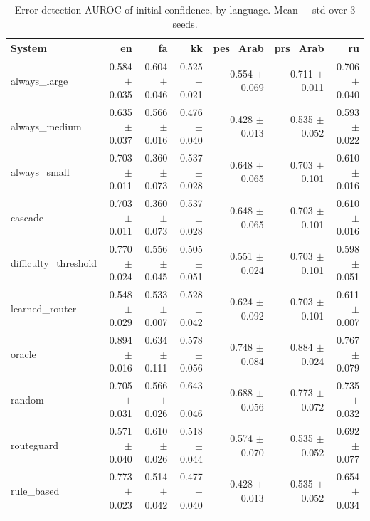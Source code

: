 \begin{table}[t]
\centering
\small
\caption{Error-detection AUROC of initial confidence, by language. Mean $\pm$ std over 3 seeds.}
\label{tab:language_reliability}
\begin{tabular}{lrrrrrr}
\toprule
System & en & fa & kk & pes\_Arab & prs\_Arab & ru \\
\midrule
always\_large & 0.584 $\pm$ 0.035 & 0.604 $\pm$ 0.046 & 0.525 $\pm$ 0.021 & 0.554 $\pm$ 0.069 & 0.711 $\pm$ 0.011 & 0.706 $\pm$ 0.040 \\
always\_medium & 0.635 $\pm$ 0.037 & 0.566 $\pm$ 0.016 & 0.476 $\pm$ 0.040 & 0.428 $\pm$ 0.013 & 0.535 $\pm$ 0.052 & 0.593 $\pm$ 0.022 \\
always\_small & 0.703 $\pm$ 0.011 & 0.360 $\pm$ 0.073 & 0.537 $\pm$ 0.028 & 0.648 $\pm$ 0.065 & 0.703 $\pm$ 0.101 & 0.610 $\pm$ 0.016 \\
cascade & 0.703 $\pm$ 0.011 & 0.360 $\pm$ 0.073 & 0.537 $\pm$ 0.028 & 0.648 $\pm$ 0.065 & 0.703 $\pm$ 0.101 & 0.610 $\pm$ 0.016 \\
difficulty\_threshold & 0.770 $\pm$ 0.024 & 0.556 $\pm$ 0.045 & 0.505 $\pm$ 0.051 & 0.551 $\pm$ 0.024 & 0.703 $\pm$ 0.101 & 0.598 $\pm$ 0.051 \\
learned\_router & 0.548 $\pm$ 0.029 & 0.533 $\pm$ 0.007 & 0.528 $\pm$ 0.042 & 0.624 $\pm$ 0.092 & 0.703 $\pm$ 0.101 & 0.611 $\pm$ 0.007 \\
oracle & 0.894 $\pm$ 0.016 & 0.634 $\pm$ 0.111 & 0.578 $\pm$ 0.056 & 0.748 $\pm$ 0.084 & 0.884 $\pm$ 0.024 & 0.767 $\pm$ 0.079 \\
random & 0.705 $\pm$ 0.031 & 0.566 $\pm$ 0.026 & 0.643 $\pm$ 0.046 & 0.688 $\pm$ 0.056 & 0.773 $\pm$ 0.072 & 0.735 $\pm$ 0.032 \\
routeguard & 0.571 $\pm$ 0.040 & 0.610 $\pm$ 0.026 & 0.518 $\pm$ 0.044 & 0.574 $\pm$ 0.070 & 0.535 $\pm$ 0.052 & 0.692 $\pm$ 0.077 \\
rule\_based & 0.773 $\pm$ 0.023 & 0.514 $\pm$ 0.042 & 0.477 $\pm$ 0.040 & 0.428 $\pm$ 0.013 & 0.535 $\pm$ 0.052 & 0.654 $\pm$ 0.034 \\
\bottomrule
\end{tabular}
\end{table}

